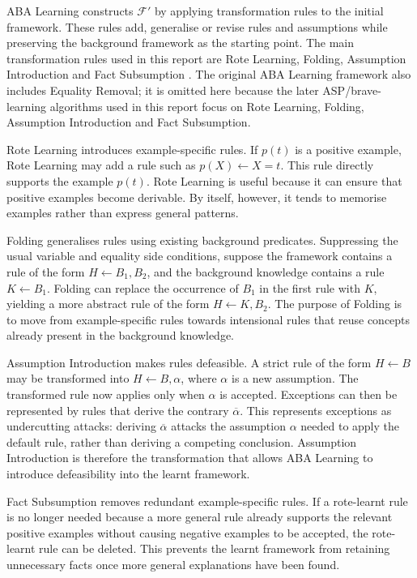 ABA Learning constructs \(\mathcal{F}'\) by applying transformation rules to the initial framework. These rules add, generalise or revise rules and assumptions while preserving the background framework as the starting point. The main transformation rules used in this report are Rote Learning, Folding, Assumption Introduction and Fact Subsumption \cite{proietti2022learning,de2023aba,de2024learning}. The original ABA Learning framework also includes Equality Removal; it is omitted here because the later ASP/brave-learning algorithms used in this report focus on Rote Learning, Folding, Assumption Introduction and Fact Subsumption.

Rote Learning introduces example-specific rules. If \(p(t)\) is a positive example, Rote Learning may add a rule such as \(p(X) \leftarrow X=t\). This rule directly supports the example \(p(t)\). Rote Learning is useful because it can ensure that positive examples become derivable. By itself, however, it tends to memorise examples rather than express general patterns.

Folding generalises rules using existing background predicates. Suppressing the usual variable and equality side conditions, suppose the framework contains a rule of the form \(H \leftarrow B_1, B_2\), and the background knowledge contains a rule \(K \leftarrow B_1\). Folding can replace the occurrence of \(B_1\) in the first rule with \(K\), yielding a more abstract rule of the form \(H \leftarrow K, B_2\). The purpose of Folding is to move from example-specific rules towards intensional rules that reuse concepts already present in the background knowledge.

Assumption Introduction makes rules defeasible. A strict rule of the form \(H \leftarrow B\) may be transformed into \(H \leftarrow B, \alpha\), where \(\alpha\) is a new assumption. The transformed rule now applies only when \(\alpha\) is accepted. Exceptions can then be represented by rules that derive the contrary \(\overline{\alpha}\). This represents exceptions as undercutting attacks: deriving \(\overline{\alpha}\) attacks the assumption \(\alpha\) needed to apply the default rule, rather than deriving a competing conclusion. Assumption Introduction is therefore the transformation that allows ABA Learning to introduce defeasibility into the learnt framework.

Fact Subsumption removes redundant example-specific rules. If a rote-learnt rule is no longer needed because a more general rule already supports the relevant positive examples without causing negative examples to be accepted, the rote-learnt rule can be deleted. This prevents the learnt framework from retaining unnecessary facts once more general explanations have been found.

